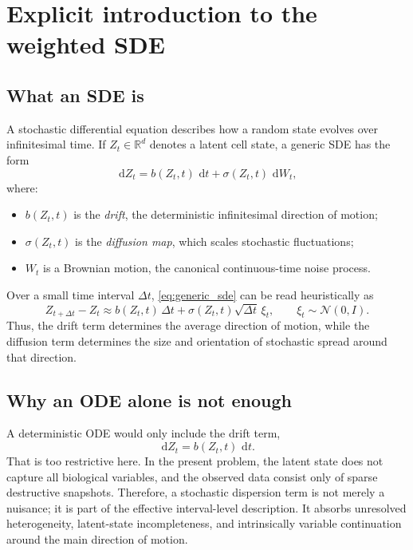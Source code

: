 \documentclass[11pt]{article}
\newcommand{\R}{\mathbb{R}}
\newcommand{\dd}{\,\mathrm{d}}
\begin{document}
\section{Explicit introduction to the weighted SDE}

\subsection{What an SDE is}

A stochastic differential equation describes how a random state evolves over infinitesimal time. If $Z_t\in\R^d$ denotes a latent cell state, a generic SDE has the form
\begin{equation}
\dd Z_t = b(Z_t,t)\,\dd t + \sigma(Z_t,t)\,\dd W_t,
\label{eq:generic_sde}
\end{equation}
where:
\begin{itemize}[leftmargin=2em]
    \item $b(Z_t,t)$ is the \emph{drift}, the deterministic infinitesimal direction of motion;
    \item $\sigma(Z_t,t)$ is the \emph{diffusion map}, which scales stochastic fluctuations;
    \item $W_t$ is a Brownian motion, the canonical continuous-time noise process.
\end{itemize}

Over a small time interval $\Delta t$, \cref{eq:generic_sde} can be read heuristically as
\begin{equation}
Z_{t+\Delta t}-Z_t
\approx
b(Z_t,t)\,\Delta t
+
\sigma(Z_t,t)\sqrt{\Delta t}\,\xi_t,
\qquad
\xi_t\sim\mathcal{N}(0,I).
\label{eq:sde_increment}
\end{equation}
Thus, the drift term determines the average direction of motion, while the diffusion term determines the size and orientation of stochastic spread around that direction.

\subsection{Why an ODE alone is not enough}

A deterministic ODE would only include the drift term,
\[
\dd Z_t = b(Z_t,t)\,\dd t.
\]
That is too restrictive here. In the present problem, the latent state does not capture all biological variables, and the observed data consist only of sparse destructive snapshots. Therefore, a stochastic dispersion term is not merely a nuisance; it is part of the effective interval-level description. It absorbs unresolved heterogeneity, latent-state incompleteness, and intrinsically variable continuation around the main direction of motion.
\end{document}
